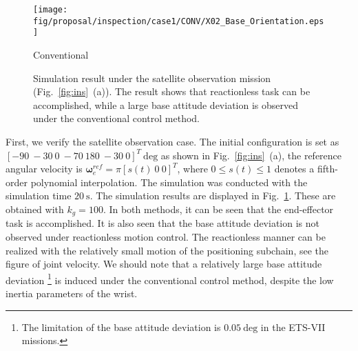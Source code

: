 \documentclass[preprint,12pt]{elsarticle}
\def\fig#1{{Fig.~\ref{fig:#1}}}
\def\unit#1{{~\mathrm{#1}}}
\begin{document}
\begin{figure}[t]
\begin{minipage}[h]{0.40\linewidth}
  \end{minipage}
  \hspace{-7mm}
  \begin{minipage}[h]{0.40\linewidth}
    \centering
    \texttt{[image: fig/proposal/inspection/case1/CONV/X02\_Base\_Orientation.eps]}
    \footnotesize\par{\hspace{8mm}\vspace{-2mm}Conventional}
  \end{minipage}
  \vspace{1em}
  \caption{Simulation result under the satellite observation mission (\fig{ins}~(a)).
  The result shows that reactionless task can be accomplished,
while a large base attitude deviation is observed under the conventional control method.}
  \label{fig:RES_INS}
\end{figure}
%
First, we verify the satellite observation case.
The initial configuration is set as $[-90~-30~0~-70~180~-30~0]^{T}\unit{deg}$ as shown in \fig{ins}~(a),
the reference angular velocity is $\bm{\omega}_{e}^{ref} = \pi[s(t)~0~0]^{T}$,
where $0 \leq s(t) \leq 1$ denotes a fifth-order polynomial interpolation.
The simulation was conducted with the simulation time $20\unit{s}$.
The simulation results are displayed in \fig{RES_INS}.
These are obtained with $k_{g} = 100$.
In both methods, it can be seen that the end-effector task is accomplished.
It is also seen that the base attitude deviation is not observed under reactionless motion control.
The reactionless manner can be realized with the relatively small motion of the positioning subchain,
see the figure of joint velocity.
We should note that a relatively large base attitude deviation
\footnote{The limitation of the base attitude deviation is $0.05\unit{deg}$ in the ETS-VII missions.}
is induced under the conventional control method,
despite the low inertia parameters of the wrist.
\end{document}
